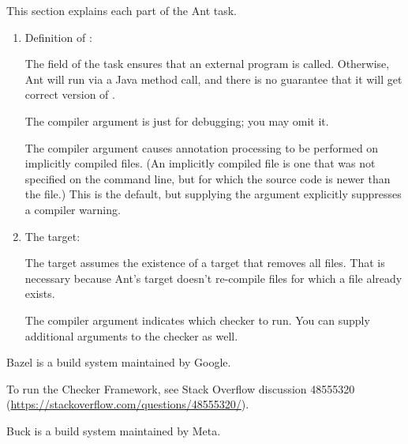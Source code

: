 
This section explains each part of the Ant task.

\begin{enumerate}
\item Definition of :

The  field of the  task
ensures that an external  program is called.  Otherwise, Ant will run
 via a Java method call, and there is no guarantee that it will get
correct version of .

The  compiler argument is just for debugging; you may omit
it.

The  compiler argument causes annotation processing
to be performed on implicitly compiled files.  (An implicitly compiled file
is one that was not specified on the command line, but for which the source
code is newer than the  file.)  This is the default, but
supplying the argument explicitly suppresses a compiler warning.


\item The  target:

The target assumes the existence of a  target that removes all
 files.  That is necessary because Ant's  target
doesn't re-compile  files for which a  file
already exists.

The  compiler argument indicates which checker to
run.  You can supply additional arguments to the checker as well.

\end{enumerate}



Bazel is a build system maintained by Google.

To run the Checker Framework, see Stack Overflow discussion 48555320
({\codesize\url{https://stackoverflow.com/questions/48555320/}}).



Buck is a build system maintained by Meta.


